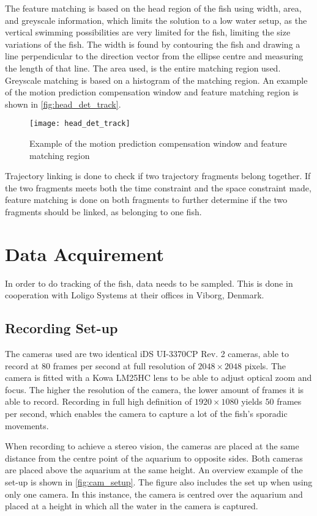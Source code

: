 The feature matching is based on the head region of the fish using width, area, and greyscale information, which limits the solution to a low water setup, as the vertical swimming possibilities are very limited for the fish, limiting the size variations of the fish. The width is found by contouring the fish and drawing a line perpendicular to the direction vector from the ellipse centre and measuring the length of that line. The area used, is the entire matching region used. Greyscale matching is based on a histogram of the matching region. An example of the motion prediction compensation window and feature matching region is shown in \autoref{fig:head_det_track}.

\begin{figure}[H]
	\centering
	\texttt{[image: head\_det\_track]}
	\caption{Example of the motion prediction compensation window and feature matching region \citep{Qian2014}}
	\label{fig:head_det_track}
\end{figure}

Trajectory linking is done to check if two trajectory fragments belong together. If the two fragments meets both the time constraint and the space constraint made, feature matching is done on both fragments to further determine if the two fragments should be linked, as belonging to one fish.

\section{Data Acquirement}
In order to do tracking of the fish, data needs to be sampled. This is done in cooperation with Loligo Systems at their offices in Viborg, Denmark.

\subsection{Recording Set-up}
The cameras used are two identical iDS UI-3370CP Rev. 2 cameras, able to record at $80$ frames per second at full resolution of $ 2048\times2048 $ pixels. The camera is fitted with a Kowa LM25HC lens to be able to adjust optical zoom and focus. The higher the resolution of the camera, the lower amount of frames it is able to record. Recording in full high definition of $1920 \times 1080$ yields $50$ frames per second, which enables the camera to capture a lot of the fish's sporadic movements.

When recording to achieve a stereo vision, the cameras are placed at the same distance from the centre point of the aquarium to opposite sides. Both cameras are placed above the aquarium at the same height. An overview example of the set-up is shown in \autoref{fig:cam_setup}. The figure also includes the set up when using only one camera. In this instance, the camera is centred over the aquarium and placed at a height in which all the water in the camera is captured. 

